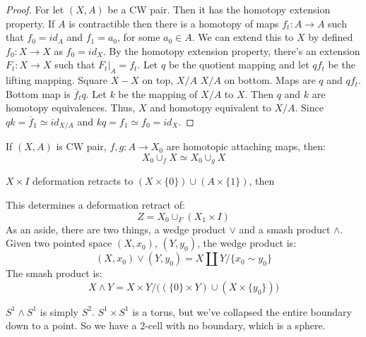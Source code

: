 \documentclass{book}                                                           %
\begin{document}
        \begin{proof}
            For let $(X,A)$ be a CW pair. Then it has the
            homotopy extension property. If $A$ is contractible
            then there is a homotopy of maps
            $f_{t}:A\rightarrow{A}$ such that $f_{0}=id_{A}$ and
            $f_{1}=a_{0}$, for some $a_{0}\in{A}$. We can
            extend this to $X$ by defined
            $f_{0}:X\rightarrow{X}$ as $f_{0}=id_{X}$. By
            the homotopy extension property, there's an
            extension $F_{t}:X\rightarrow{X}$ such that
            $F_{t}|_{A}=f_{t}$. Let $q$ be the quotient
            mapping and let $qf_{t}$ be the lifting mapping.
            Square $X-X$ on top, $X/A$ $X/A$ on bottom. Maps are
            $q$ and $qf_{t}$. Bottom map is
            $\overline{f}_{t}q$. Let $k$ be the mapping
            of $X/A$ to $X$. Then $q$ and $k$ are homotopy
            equivalences. Thus, $X$ and homotopy equivalent
            to $X/A$. Since $qk=\overline{f}_{1}\simeq{id}_{X/A}$
            and $kq=f_{1}\simeq{f}_{0}=id_{X}$.
        \end{proof}
        \begin{theorem}
            If $(X,A)$ is CW pair, $f,g:A\rightarrow{X_{0}}$
            are homotopic attaching maps, then:
            \begin{equation}
                X_{0}\cup_{f}X\simeq{X}_{0}\cup_{g}X
            \end{equation}
        \end{theorem}
        \begin{theorem}
            $X\times{I}$ deformation retracts to
            $(X\times\{0\})\cup(A\times\{1\})$, then
        \end{theorem}
        This determines a deformation retract of:
        \begin{equation}
            Z=X_{0}\cup_{F}(X_{1}\times{I})
        \end{equation}
        As an aside, there are two things, a wedge product
        $\lor$ and a smash product $\land$. Given two pointed
        space $(X,x_{0})$, $(Y,y_{0})$, the wedge product is:
        \begin{equation}
            (X,x_{0})\lor(Y,y_{0})
            =X\coprod{Y}/\{x_{0}\sim{y}_{0}\}
        \end{equation}
        The smash product is:
        \begin{equation}
            X\land{Y}=
            X\times{Y}/\Big(
                (\{0\}\times{Y})\cup(X\times\{y_{0}\})
            \Big)
        \end{equation}
        \begin{example}
            $S^{1}\land{S}^{1}$ is simply $S^{2}$.
            $S^{1}\times{S}^{1}$ is a torus, but we've collapsed
            the entire boundary down to a point. So we have a
            2-cell with no boundary, which is a sphere.
        \end{example}
\end{document}
